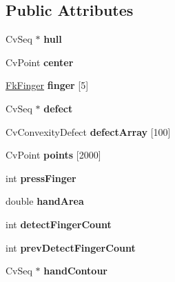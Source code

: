 \subsection*{Public Attributes}
\begin{DoxyCompactItemize}
\item 
\hypertarget{class_fk_hand_a39bd48af2ef99c0f04b8f18ff714a483}{}Cv\+Seq $\ast$ {\bfseries hull}\label{class_fk_hand_a39bd48af2ef99c0f04b8f18ff714a483}

\item 
\hypertarget{class_fk_hand_ab76554535af1bcd7692de11639bb13f8}{}Cv\+Point {\bfseries center}\label{class_fk_hand_ab76554535af1bcd7692de11639bb13f8}

\item 
\hypertarget{class_fk_hand_ad72b83878407ad41ea4121424bc22fac}{}\hyperlink{class_fk_finger}{Fk\+Finger} {\bfseries finger} \mbox{[}5\mbox{]}\label{class_fk_hand_ad72b83878407ad41ea4121424bc22fac}

\item 
\hypertarget{class_fk_hand_a7ea3bfe4526be7750f2e01a9bc2aea11}{}Cv\+Seq $\ast$ {\bfseries defect}\label{class_fk_hand_a7ea3bfe4526be7750f2e01a9bc2aea11}

\item 
\hypertarget{class_fk_hand_a180ee545eecfe176432d6120c8ad35da}{}Cv\+Convexity\+Defect {\bfseries defect\+Array} \mbox{[}100\mbox{]}\label{class_fk_hand_a180ee545eecfe176432d6120c8ad35da}

\item 
\hypertarget{class_fk_hand_a99d60c4e0adab37375cd8eac7fa6f035}{}Cv\+Point {\bfseries points} \mbox{[}2000\mbox{]}\label{class_fk_hand_a99d60c4e0adab37375cd8eac7fa6f035}

\item 
\hypertarget{class_fk_hand_a383c419b57265db7d94d3218645764ca}{}int {\bfseries press\+Finger}\label{class_fk_hand_a383c419b57265db7d94d3218645764ca}

\item 
\hypertarget{class_fk_hand_a391a3239b38d7287033af07c26f51a33}{}double {\bfseries hand\+Area}\label{class_fk_hand_a391a3239b38d7287033af07c26f51a33}

\item 
\hypertarget{class_fk_hand_af53677a8e8fc4ca6067db5fbfd8d8dd7}{}int {\bfseries detect\+Finger\+Count}\label{class_fk_hand_af53677a8e8fc4ca6067db5fbfd8d8dd7}

\item 
\hypertarget{class_fk_hand_a0f09134303518327f47eb7730e7d7bb0}{}int {\bfseries prev\+Detect\+Finger\+Count}\label{class_fk_hand_a0f09134303518327f47eb7730e7d7bb0}

\item 
\hypertarget{class_fk_hand_a451c9eccab61d5ed6475e5a567d637dc}{}Cv\+Seq $\ast$ {\bfseries hand\+Contour}\label{class_fk_hand_a451c9eccab61d5ed6475e5a567d637dc}

\end{DoxyCompactItemize}


